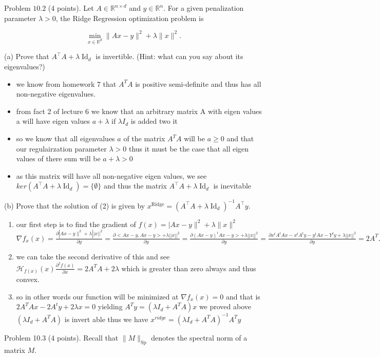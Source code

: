 \documentclass[10pt]{article}
\begin{document}
Problem $10.2$ (4 points). Let $A \in \mathbb{R}^{n \times d}$ and $y \in \mathbb{R}^{n}$. For a given penalization parameter $\lambda>0$, the Ridge Regression optimization problem is

$$
\min _{x \in \mathbb{R}^{d}}\|A x-y\|^{2}+\lambda\|x\|^{2} .
$$

(a) Prove that $A^{\top} A+\lambda \operatorname{Id}_{d}$ is invertible. (Hint: what can you say about its eigenvalues?)
\begin{itemize}
    \item we know from homework 7 that $A^TA$ is positive semi-definite and thus has all non-negative eigenvalues. 
    \item from fact 2 of lecture 6 we know that an arbitrary matrix A with eigen values a will have eigen values $a+\lambda$ if $\lambda I_d$  is added two it 
    \item so we know that all eigenvalues $a$ of the matrix $A^TA$ will be $a\geq 0$ and that our regulairzation parameter $\lambda >0$ thus it must be the case that all eigen values of there sum will be $a+\lambda>0$ 
    \item as this matrix will have all non-negative eigen values, we see $ker(A^{\top} A+\lambda \operatorname{Id}_{d})=\{\emptyset\}$ and thus the matrix $A^{\top} A+\lambda \operatorname{Id}_{d}$ is inevitable 
\end{itemize}

(b) Prove that the solution of (2) is given by $x^{\operatorname{Ridge}}=\left(A^{\top} A+\lambda \operatorname{Id}_{d}\right)^{-1} A^{\top} y$.
\begin{itemize}
    \begin{enumerate}
        \item our first step is to find the gradient of $f(x)=|A x-y\|^{2}+\lambda\|x\|^{2}$
        $\nabla f_x(x)= \frac{\partial|A x-y\|^{2}+\lambda||x||^2}{\partial y}=\frac{\partial<Ax-y,Ax-y>+\lambda||x||^2}{\partial y}=\frac{\partial(Ax-y)^tAx-y>+\lambda||x||^2}{\partial y}=\frac{\partial x^tA^tAx-x^tA^ty-y^tAx-Y^ty+\lambda||x||^2}{\partial y}=2A^TAx-2A^ty+2\lambda x$
        \item we can take the second derivative of this and see $\mathcal{H}_{f(x)}(x)\frac{\partial^2f(x)}{\partial x}=2A^TA+2\lambda$ which is greater than zero always and thus convex. 
        \item so in other words our function will be minimized at $\nabla f_{x}(x)=0$ and that is $2A^TAx-2A^ty+2\lambda x=0$ yielding $A^Ty=(\lambda I_d +A^TA)x$ we proved above $(\lambda I_d +A^TA)$ is invert able thus we have $x^{ridge}=(\lambda I_d +A^TA)^{-1}A^Ty$
    \end{enumerate} 
\end{itemize}
\newpage
Problem 10.3 (4 points). Recall that $\|M\|_{\mathrm{Sp}}$ denotes the spectral norm of a matrix $M$.
\end{document}
